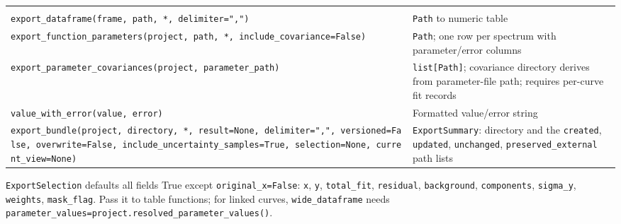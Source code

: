 \documentclass[
  10pt,
  a4paper,
  oneside]{scrreprt}
\begin{document}
\begin{longtable}[]{@{}ll@{}}
\begin{minipage}[t]{0.47\columnwidth}
\end{minipage}\tabularnewline
\begin{minipage}[t]{0.47\columnwidth}\raggedright
\texttt{export\_dataframe(frame,\ path,\ *,\ delimiter=",")}\strut
\end{minipage} & \begin{minipage}[t]{0.47\columnwidth}\raggedright
\texttt{Path} to numeric table\strut
\end{minipage}\tabularnewline
\begin{minipage}[t]{0.47\columnwidth}\raggedright
\texttt{export\_function\_parameters(project,\ path,\ *,\ include\_covariance=False)}\strut
\end{minipage} & \begin{minipage}[t]{0.47\columnwidth}\raggedright
\texttt{Path}; one row per spectrum with parameter/error columns\strut
\end{minipage}\tabularnewline
\begin{minipage}[t]{0.47\columnwidth}\raggedright
\texttt{export\_parameter\_covariances(project,\ parameter\_path)}\strut
\end{minipage} & \begin{minipage}[t]{0.47\columnwidth}\raggedright
\texttt{list{[}Path{]}}; covariance directory derives from
parameter-file path; requires per-curve fit records\strut
\end{minipage}\tabularnewline
\begin{minipage}[t]{0.47\columnwidth}\raggedright
\texttt{value\_with\_error(value,\ error)}\strut
\end{minipage} & \begin{minipage}[t]{0.47\columnwidth}\raggedright
Formatted value/error string\strut
\end{minipage}\tabularnewline
\begin{minipage}[t]{0.47\columnwidth}\raggedright
\texttt{export\_bundle(project,\ directory,\ *,\ result=None,\ delimiter=",",\ versioned=False,\ overwrite=False,\ include\_uncertainty\_samples=True,\ selection=None,\ current\_view=None)}\strut
\end{minipage} & \begin{minipage}[t]{0.47\columnwidth}\raggedright
\texttt{ExportSummary}: directory and the \texttt{created},
\texttt{updated}, \texttt{unchanged}, \texttt{preserved\_external} path
lists\strut
\end{minipage}\tabularnewline
\bottomrule
\end{longtable}

\texttt{ExportSelection} defaults all fields True except
\texttt{original\_x=False}: \texttt{x}, \texttt{y}, \texttt{total\_fit},
\texttt{residual}, \texttt{background}, \texttt{components},
\texttt{sigma\_y}, \texttt{weights}, \texttt{mask\_flag}. Pass it to
table functions; for linked curves, \texttt{wide\_dataframe} needs
\texttt{parameter\_values=project.resolved\_parameter\_values()}.
\end{document}
